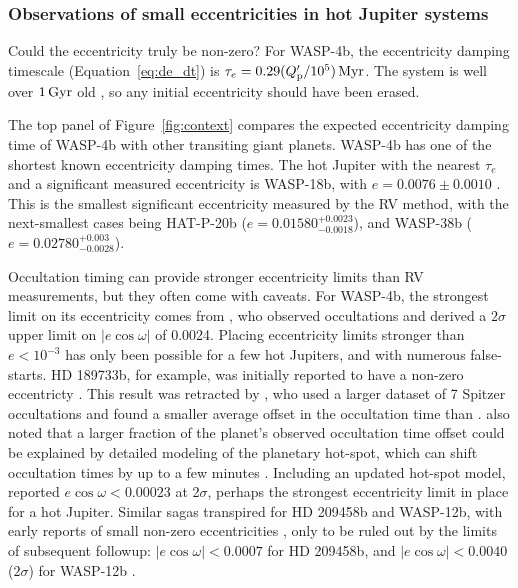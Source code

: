 \documentclass[12pt,twocolumn,tighten]{aastex62}
\begin{document}
\subsubsection{Observations of small eccentricities in hot
Jupiter systems}

Could the eccentricity truly be non-zero?  For WASP-4b, the
eccentricity damping timescale (Equation~\ref{eq:de_dt}) is $\tau_e =
0.29 (Q_{\rm p}'/10^5) \, {\rm Myr}$.  The system is well over
$1\,{\rm Gyr}$ old \citep[{\it e.g.},][]{winn_transit_2009}, so any
initial eccentricity should have been erased.

The top panel of Figure~\ref{fig:context} compares the expected
eccentricity damping time of WASP-4b with other transiting giant
planets.  WASP-4b has one of the shortest known eccentricity damping
times.  The hot Jupiter with the nearest $\tau_e$ and a significant
measured eccentricity is WASP-18b, with $e = 0.0076 \pm 0.0010$
\citep{triaud_spin-orbit_2010,bonomo_gaps_2017}.  This is the smallest
significant eccentricity measured by the RV method, with the
next-smallest cases being HAT-P-20b ($e =
0.01580^{+0.0023}_{-0.0018}$), and WASP-38b ($e =
0.02780^{+0.003}_{-0.0028}$).

Occultation timing can provide stronger eccentricity limits than RV
measurements, but they often come with caveats.  For WASP-4b, the
strongest limit on its eccentricity comes from
\citet{beerer_secondary_2011}, who observed occultations and derived a
$2\sigma$ upper limit on $| e\cos\omega | $ of 0.0024.
Placing eccentricity limits stronger than $e< 10^{-3}$ has only been
possible for a few hot Jupiters, and with numerous false-starts.
HD 189733b, for example, was initially reported to have a non-zero
eccentricty
\citep{knutson_map_2007}.  This result was retracted by
\citet{agol_climate_2010}, who used a larger dataset of 7 Spitzer
occultations and found a smaller average offset in the occultation
time than \citet{knutson_map_2007}.  \citet{agol_climate_2010} also
noted that a larger fraction of the planet's observed occultation time
offset could be explained by detailed modeling of the planetary
hot-spot, which can shift occultation times by up to a few minutes
\citep{williams_resolving_2006}.  Including an updated hot-spot model,
\citet{agol_climate_2010} reported $e\cos\omega < 0.00023$ at
2$\sigma$, perhaps the strongest eccentricity limit in place for a hot
Jupiter.  Similar sagas transpired for HD 209458b and WASP-12b, with
early reports of small non-zero eccentricities
\citep{winn_measurement_2005,hebb_wasp-12b_2009,lopez-morales_day-side_2010},
only to be ruled out by the limits of subsequent followup:
$|e\cos\omega| < 0.0007$ for HD 209458b, and $| e\cos\omega| < 0.0040$
($2\sigma$) for WASP-12b
\citep{crossfield_spitzer_mips_2012,campo_orbit_2011,croll_near-infrared_2011}.
\end{document}
